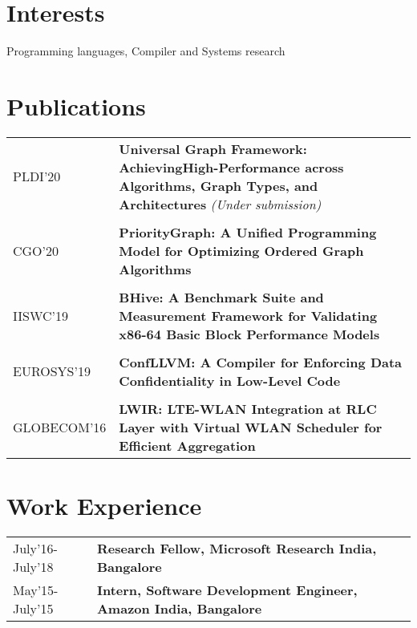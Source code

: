 \documentclass[10pt]{article}
\newcommand \VRule{}
\begin{document}
\section*{Interests}
Programming languages, Compiler and Systems research

\section*{Publications}
\begin{tabular}{l!{\VRule}p{15cm}}

PLDI'20 & {\bf Universal Graph Framework: AchievingHigh-Performance across Algorithms, Graph Types, and Architectures} \textit{(Under submission)} \\ \\
CGO'20 & {\bf PriorityGraph: A Unified Programming Model for Optimizing Ordered Graph Algorithms} \\ \\ 
IISWC'19 & {\bf BHive: A Benchmark Suite and Measurement Framework for Validating x86-64 Basic Block Performance Models} \\ \\
EUROSYS'19 & {\bf ConfLLVM: A Compiler for Enforcing Data Confidentiality in Low-Level Code} \\ \\
GLOBECOM'16 & {\bf LWIR: LTE-WLAN Integration at RLC Layer with Virtual WLAN Scheduler for Efficient Aggregation } \\
\end{tabular}

\section*{Work Experience}
\begin{tabular}{l!{\VRule}p{15cm}}
July'16-July'18 & {\bf Research Fellow, Microsoft Research India, Bangalore } \\
May'15-July'15 & {\bf Intern, Software Development Engineer, Amazon India, Bangalore } \\
\end{tabular}
\end{document}
